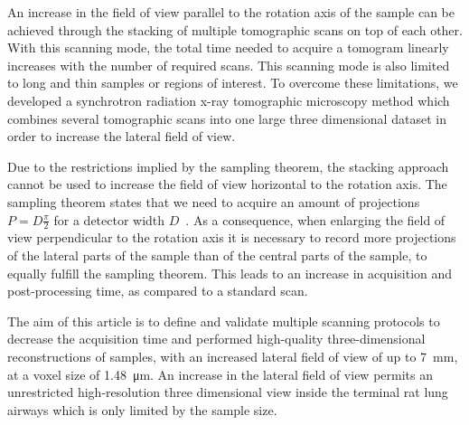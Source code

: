 An increase in the field of view parallel to the rotation axis of the sample can be achieved through the stacking of multiple tomographic scans on top of each other. With this scanning mode, the total time needed to acquire a tomogram linearly increases with the number of required scans. This scanning mode is also limited to long and thin samples or regions of interest. To overcome these limitations, we developed a synchrotron radiation x-ray tomographic microscopy method which combines several tomographic scans into one large three dimensional dataset in order to increase the lateral field of view.

Due to the restrictions implied by the sampling theorem, the stacking approach cannot be used to increase the field of view horizontal to the rotation axis. The sampling theorem states that we need to acquire an amount of projections $P=D\frac{\pi}{2}$ for a detector width $D$~\cite[page 186]{Kak2002}. As a consequence, when enlarging the field of view perpendicular to the rotation axis it is necessary to record more projections of the lateral parts of the sample than of the central parts of the sample, to equally fulfill the sampling theorem. This leads to an  increase in acquisition and post-processing time, as compared to a standard scan.

The aim of this article is to define and validate multiple scanning protocols to decrease the acquisition time and performed high-quality three-dimensional reconstructions of samples, with an increased lateral field of view of up to \SI{7}{\milli\meter}, at a voxel size of \SI{1.48}{\micro\meter}. An increase in the lateral field of view permits an unrestricted high-resolution three dimensional view inside the terminal rat lung airways which is only limited by the sample size.